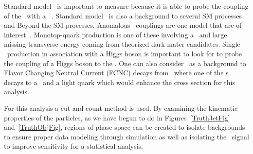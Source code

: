 Standard model \tz~is important to measure because it is able to probe the coupling of the \at~with a \az~\cite{Campbell:2013yla}. Standard model \tz~is also a background to several SM processes and Beyond the SM processes. Anomalous \tz~couplings are one model that are of interest~\cite{Dror:2015nkp}. Monotop-quark production is one of these involving a \at~and large missing transverse energy coming from theorized dark mater candidates. Single \at~production in association with a Higgs boson is important to look for to probe the coupling of a Higgs boson to the \at. One can also consider \tz~as a background to Flavor Changing Neutral Current (FCNC) decays from \TTB~where one of the \at s decays to a \az~and a light quark which would enhance the cross section for this analysis. 

For this analysis a cut and count method is used. By examining the kinematic properties of the particles, as we have begun to do in Figures~\ref{TruthJetFig} and~\ref{TruthObjFig}, regions of phase space can be created to isolate backgrounds to ensure proper data modeling through simulation as well as isolating the \tz~signal to improve sensitivity for a statistical analysis. 







